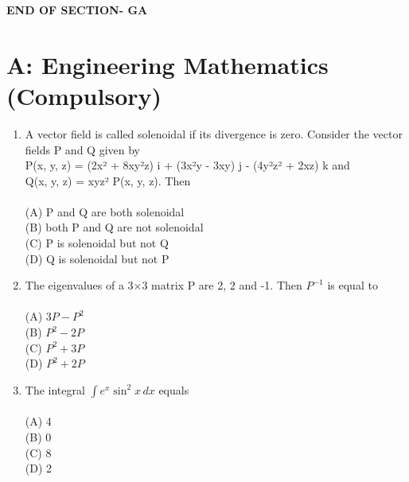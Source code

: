 \documentclass[journal,12pt,onecolumn]{IEEEtran}
\begin{document}
\begin{enumerate}[label=\textbf{Q\arabic*.},itemsep=2em]
\vspace{3\baselineskip}
    \begin{center}
    \textbf{\Large END OF SECTION- GA}
    \end{center}
    
\end{enumerate}

\clearpage
\section*{A: Engineering Mathematics (Compulsory)}
\begin{enumerate}[label=\textbf{Q\arabic*.},itemsep=2em]
\vspace{1cm}

\item A vector field is called solenoidal if its divergence is zero. Consider the vector fields P and Q given by \\
P(x, y, z) = (2x² + 8xy²z) i + (3x²y - 3xy) j - (4y²z² + 2xz) k and \\
Q(x, y, z) = xyz² P(x, y, z). Then \\
\vspace{0.2cm}
\hfill{} \\
(A) P and Q are both solenoidal \\
(B) both P and Q are not solenoidal \\
(C) P is solenoidal but not Q \\
(D) Q is solenoidal but not P

\item The eigenvalues of a 3×3 matrix P are 2, 2 and -1. Then $P^{-1}$ is equal to \\
\vspace{0.2cm}
\hfill{} \\
(A) $3P - P^2$ \\
(B) $P^2 - 2P$ \\
(C) $P^2 + 3P$ \\
(D) $P^2 + 2P$

\item The integral $\int e^x \sin^2 x \, dx$ equals \\
\vspace{0.2cm}
\hfill{} \\
(A) 4 \\
(B) 0 \\
(C) 8 \\
(D) 2


\end{enumerate}
\end{document}
